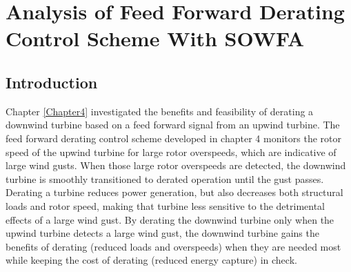 
\chapter{Analysis of Feed Forward Derating Control Scheme With SOWFA} %

\label{Chapter6} %



\section{Introduction} \label{section6-1}

Chapter \ref{Chapter4} investigated the benefits and feasibility of derating a downwind turbine based on a feed forward signal from an upwind turbine. The feed forward derating control scheme developed in chapter 4 monitors the rotor speed of the upwind turbine for large rotor overspeeds, which are indicative of large wind gusts. When those large rotor overspeeds are detected, the downwind turbine is smoothly transitioned to derated operation until the gust passes. Derating a turbine reduces power generation, but also decreases both structural loads and rotor speed, making that turbine less sensitive to the detrimental effects of a large wind gust. By derating the downwind turbine only when the upwind turbine detects a large wind gust, the downwind turbine gains the benefits of derating (reduced loads and overspeeds) when they are needed most while keeping the cost of derating (reduced energy capture) in check.

